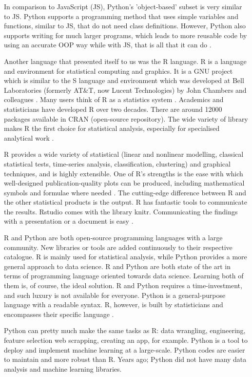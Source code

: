 	In comparison to JavaScript (JS), Python's 'object-based' subset is very similar to JS. Python supports a programming method that uses simple variables and functions, similar to JS, that do not need class definitions. However, Python also supports writing for much larger programs, which leads to more reusable code by using an accurate OOP way while with JS, that is all that it can do \cite{python_comparison}.
	
	Another language that presented itself to us was the R language. R is a language and environment for statistical computing and graphics. It is a GNU project which is similar to the S language and environment which was developed at Bell Laboratories (formerly AT\&T, now Lucent Technologies) by John Chambers and colleagues \cite{r_project}. Many users think of R as a statistics system \cite{r_project}. Academics and statisticians have developed R over two decades. There are around 12000 packages available in CRAN (open-source repository). The wide variety of library makes R the first choice for statistical analysis, especially for specialised analytical work \cite{r_vs_py}.
	
	R provides a wide variety of statistical (linear and nonlinear modelling, classical statistical tests, time-series analysis, classification, clustering) and graphical techniques, and is highly extensible. One of R's strengths is the ease with which well-designed publication-quality plots can be produced, including mathematical symbols and formulae where needed \cite{r_project}. The cutting-edge difference between R and the other statistical products is the output. R has fantastic tools to communicate the results. Rstudio comes with the library knitr. Communicating the findings with a presentation or a document is easy \cite{r_vs_py}.
	
	R and Python are both open-source programming languages with a large community. New libraries or tools are added continuously to their respective catalogue. R is mainly used for statistical analysis, while Python provides a more general approach to data science.
	R and Python are both state of the art in terms of programming language oriented towards data science. Learning both of them is, of course, the ideal solution. R and Python requires a time-investment, and such luxury is not available for everyone. Python is a general-purpose language with a readable syntax. R, however, is built by statisticians and encompasses their specific language \cite{r_vs_py}.
	
	Python can pretty much make the same tasks as R: data wrangling, engineering, feature selection web scrapping, creating an app, for example. Python is a tool to deploy and implement machine learning at a large-scale. Python codes are easier to maintain and more robust than R. Years ago; Python did not have many data analysis and machine learning libraries. 
	

